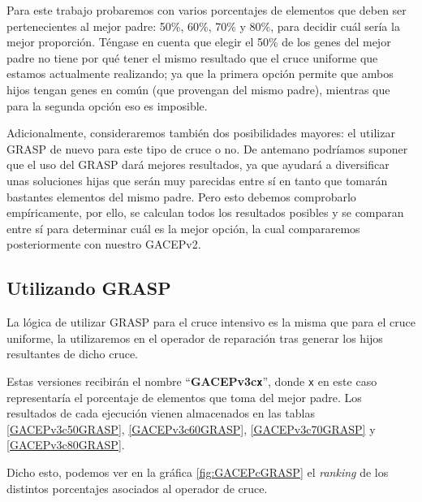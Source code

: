 Para este trabajo probaremos con varios porcentajes de elementos que deben ser pertenecientes al mejor padre: 50\%, 60\%, 70\% y 80\%, para decidir cuál sería la mejor proporción. 
Téngase en cuenta que elegir el 50\% de los genes del mejor padre no tiene por qué tener el mismo resultado que el cruce uniforme que estamos actualmente realizando; ya que la primera opción permite que ambos hijos tengan genes en común (que provengan del mismo padre), mientras que para la segunda opción eso es imposible. 

Adicionalmente, consideraremos también dos posibilidades mayores: el utilizar GRASP de nuevo para este tipo de cruce o no. 
De antemano podríamos suponer que el uso del GRASP dará mejores resultados, ya que ayudará a diversificar unas soluciones hijas que serán muy parecidas entre sí en tanto que tomarán bastantes elementos del mismo padre. 
Pero esto debemos comprobarlo empíricamente, por ello, se calculan todos los resultados posibles y se comparan entre sí para determinar cuál es la mejor opción, la cual compararemos posteriormente con nuestro GACEPv2. 

\subsection{Utilizando GRASP}

La lógica de utilizar GRASP para el cruce intensivo es la misma que para el cruce uniforme, la utilizaremos en el operador de reparación tras generar los hijos resultantes de dicho cruce. 

Estas versiones recibirán el nombre ``\textbf{GACEPv3c\texttt{x}}'', donde \texttt{x} en este caso representaría el porcentaje de elementos que toma del mejor padre. 
Los resultados de cada ejecución vienen almacenados en las tablas \ref{GACEPv3c50GRASP}, \ref{GACEPv3c60GRASP}, \ref{GACEPv3c70GRASP} y \ref{GACEPv3c80GRASP}.

Dicho esto, podemos ver en la gráfica \ref{fig:GACEPcGRASP} el \textit{ranking} de los distintos porcentajes asociados al operador de cruce.

